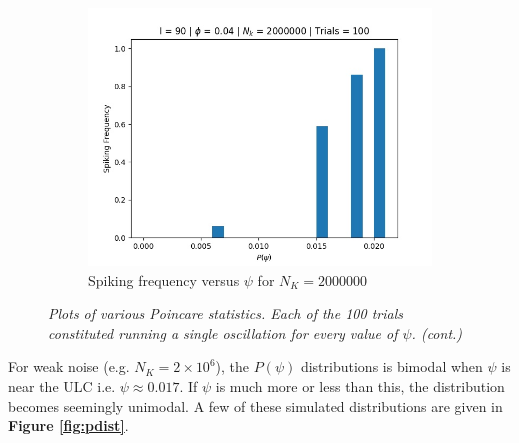 \documentclass[letterpaper,12pt]{article}
\numberwithin{table}{section}
\numberwithin{figure}{section}
\numberwithin{equation}{section}
\newcommand{\ccaption}[1]{\caption{\textit{#1}}}
\newcommand{\reffig}[1]{\textbf{Figure \ref{#1}}}
\begin{document}
\begin{flushleft}
\begin{figure}[!h]
        \begin{subfigure}{0.72\textwidth}
            \includegraphics[width=\linewidth]{img/pspike-nk2000000.jpg}
            \caption{Spiking frequency versus $\psi$ for $N_K = 2000000$}
        \end{subfigure}

        \captionsetup{width=0.8\linewidth}
        \ccaption{Plots of various Poincare statistics. Each of the 100 trials constituted running a single oscillation for every value of $\psi$. (cont.)}
        \label{fig:poincare}

    \end{figure}

    For weak noise (e.g. $N_K = 2 \times 10^6$), the $P(\psi)$ distributions is bimodal when $\psi$ is near the ULC i.e. $\psi \approx 0.017$. If $\psi$ is much more or less than this, the distribution becomes seemingly unimodal. A few of these simulated distributions are given in \reffig{fig:pdist}.
    \begin{figure}[!h]

        \centering


\end{figure}
\end{flushleft}
\end{document}
